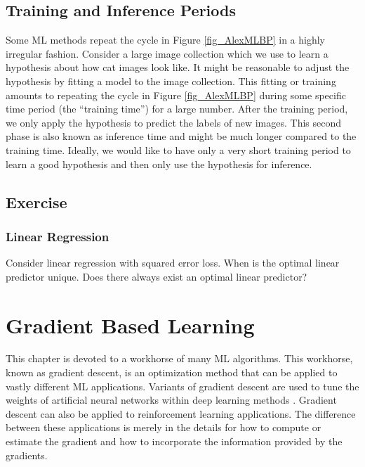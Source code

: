 \documentclass[12pt]{report}
\begin{document}
\section{Training and Inference Periods} 
Some ML methods repeat the cycle in Figure \ref{fig_AlexMLBP} in a 
highly irregular fashion. Consider a large image collection which we 
use to learn a hypothesis about how cat images look like. It might 
be reasonable to adjust the hypothesis by fitting a model to the image 
collection. This fitting or training amounts to repeating the cycle in Figure \ref{fig_AlexMLBP} 
during some specific time period (the ``training time'') for a large number. After the training period, 
we only apply the hypothesis to predict the labels of new images. This second phase is also known 
as inference time and might be much longer compared to the training time. Ideally, we would like 
to have only a very short training period to learn a good hypothesis and then only use the hypothesis 
for inference. 

\section{Exercise} 
\label{sec_exercise_chap_4} 

\subsection{Linear Regression}
\label{ex_chap_5_lin_reg} 
Consider linear regression with squared error loss. When is the optimal linear predictor 
unique. Does there always exist an optimal linear predictor?



\newpage
\chapter{Gradient Based Learning}
\label{ch_GD}

This chapter is devoted to a workhorse of many ML algorithms. This workhorse, 
known as gradient descent, is an optimization method that can be applied to vastly different 
ML applications. Variants of gradient descent are used to tune the weights of 
artificial neural networks within deep learning methods \cite{Goodfellow-et-al-2016}. Gradient 
descent can also be applied to reinforcement learning applications. The difference between 
these applications is merely in the details for how to compute or estimate the gradient and 
how to incorporate the information provided by the gradients. 
\end{document}
